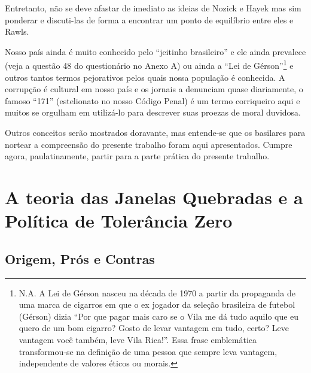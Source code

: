 \documentclass[
	12pt,				%
	openright,			%
	twoside,			%
	a4paper,			%
	chapter=TITLE,		%
	section=TITLE,		%
	subsection=TITLE,	%
	subsubsection=TITLE,%
	spanish,            %
	english,			%
	brazil				%
	]{abntex2}
\begin{document}
\par
Entretanto, não se deve afastar de imediato as ideias de Nozick e Hayek mas sim ponderar e discuti-las de forma a encontrar um ponto de equilíbrio  entre eles e Rawls.
\par
Nosso país ainda é muito conhecido pelo “jeitinho brasileiro” e ele ainda prevalece (veja a questão 48 do questionário no Anexo A) ou ainda a “Lei de Gérson”\footnote{N.A. A Lei de Gérson nasceu  na década de 1970 a partir da propaganda de uma marca de cigarros em que o ex jogador da seleção brasileira de futebol (Gérson) dizia “Por que pagar mais caro se o Vila me dá tudo aquilo que eu quero de um bom cigarro? Gosto de levar vantagem em tudo, certo? Leve vantagem você também, leve Vila Rica!”. Essa frase emblemática transformou-se na definição de uma pessoa que sempre leva vantagem, independente de valores éticos ou morais.} e outros tantos termos pejorativos pelos quais nossa população é conhecida. A corrupção é cultural em nosso país e os jornais a denunciam quase diariamente, o famoso “171” (estelionato no nosso Código Penal) é um termo corriqueiro aqui e muitos se orgulham em utilizá-lo para descrever suas proezas de moral duvidosa.
\par
Outros conceitos serão mostrados doravante, mas entende-se que os basilares para nortear a compreensão do presente trabalho foram aqui apresentados. Cumpre agora, paulatinamente, partir para a parte prática do presente trabalho.

\chapter{A teoria das Janelas Quebradas e a Política de Tolerância Zero}
\section{Origem, Prós e Contras}
\end{document}
